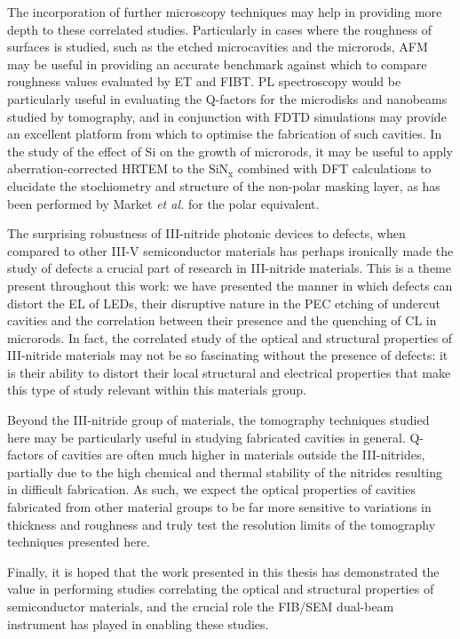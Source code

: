 The incorporation of further microscopy techniques may help in providing more depth to these correlated studies. Particularly in cases where the roughness of surfaces is studied, such as the etched microcavities and the microrods, AFM may be useful in providing an accurate benchmark against which to compare roughness values evaluated by ET and FIBT. PL spectroscopy would be particularly useful in evaluating the Q-factors for the microdisks and nanobeams studied by tomography, and in conjunction with FDTD simulations may provide an excellent platform from which to optimise the fabrication of such cavities. In the study of the effect of Si on the growth of microrods, it may be useful to apply aberration-corrected HRTEM to the $\mathrm{SiN_{x}}$ combined with DFT calculations to elucidate the stochiometry and structure of the non-polar masking layer, as has been performed by Market \textit{et al.} for the polar equivalent.    

The surprising robustness of III-nitride photonic devices to defects, when compared to other III-V semiconductor materials has  perhaps ironically made the study of defects a crucial part of research in III-nitride materials. This is a theme present throughout this work: we have presented the manner in which defects can distort the EL of LEDs, their disruptive nature in the PEC etching of undercut cavities and the correlation between their presence and the quenching of CL in microrods. In fact, the correlated study of the optical and structural properties of III-nitride materials may not be so fascinating without the presence of defects: it is their ability to distort their local structural and electrical properties that make this type of study relevant within this materials group.

Beyond the III-nitride group of materials, the tomography techniques studied here may be particularly useful in studying fabricated cavities in general. Q-factors of cavities are often much higher in materials outside the III-nitrides, partially due to the high chemical and thermal stability of the nitrides resulting in difficult fabrication. As such, we expect the optical properties of cavities fabricated from other material groups to be far more sensitive to variations in thickness and roughness and truly test the resolution limits of the tomography techniques presented here.

Finally, it is hoped that the work presented in this thesis has demonstrated the value in performing studies correlating the optical and structural properties of semiconductor materials, and the crucial role the FIB/SEM dual-beam instrument has played in enabling these studies. 






